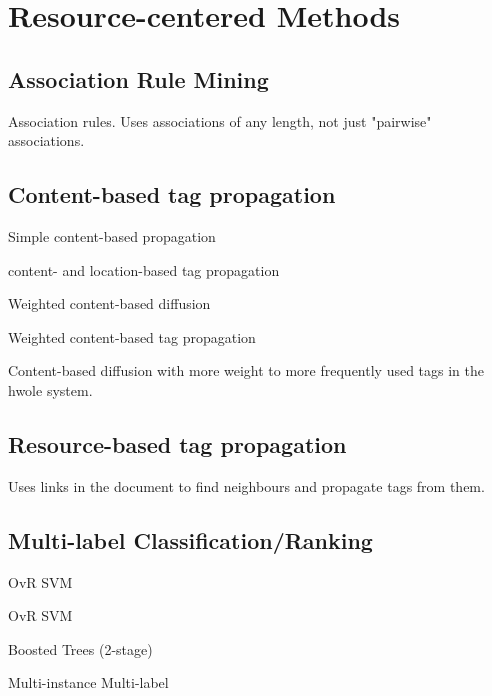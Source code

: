 \section{Resource-centered Methods}\label{section:resource_centered_methods}


\subsection{Association Rule Mining}

\cite{heymann_etal_2008}

\cite{vanleeuwen_puspitaningrum_2012} Association rules. Uses associations of any length, not just "pairwise" associations.

\subsection{Content-based tag propagation}

\cite{mishne_2006} Simple content-based propagation

\cite{sordo_etal_2007}

\cite{moxley_etal_2008} content- and location-based tag propagation

\cite{guillaumin_etal_2009} Weighted content-based diffusion

\cite{li_etal_2009} Weighted content-based tag propagation

\cite{zhao_etal_2010} Content-based diffusion with more weight to more frequently used tags in the hwole system.

\subsection{Resource-based tag propagation}

\cite{auyeung_etal_2009} Uses links in the document to find neighbours and propagate tags from them.

\subsection{Multi-label Classification/Ranking}

\cite{chen_etal_2008} OvR SVM

\cite{katakis_etal_2008} OvR SVM

\cite{bertin-mahieux_etal_2008} Boosted Trees (2-stage)

\cite{song_etal_2008}

\cite{shen_etal_2009} Multi-instance Multi-label

